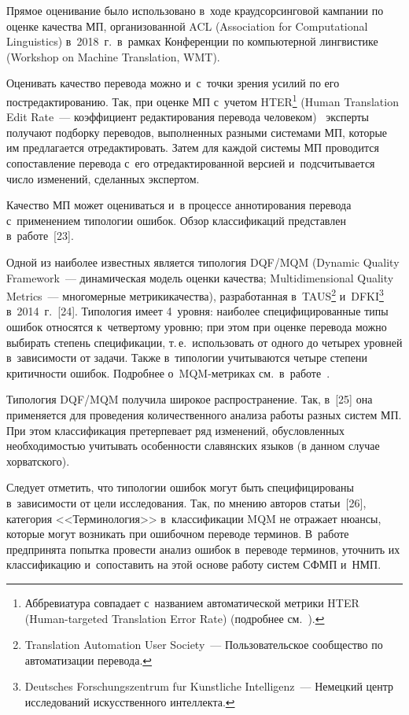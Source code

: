 \begin{multicols}{2}
  
  Прямое оценивание было использовано в~ходе краудсорсинговой кампании 
по оценке качества МП, организованной ACL (Association for Computational 
Linguistics) в~2018~г.\ в~рамках Конференции по компьютерной лингвистике 
(Workshop on Machine Translation, WMT).
  
  Оценивать качество перевода можно и~с~точки зрения усилий по его 
постредактированию. Так, при оценке МП с~учетом 
HTER\footnote{Аббревиатура совпадает с~названием автоматической метрики HTER  
(Human-targeted Translation Error Rate) (подробнее см.~\cite[с.~25]{18-nur}).} (Human 
Translation Edit Rate~--- коэффициент редактирования перевода 
человеком)~\cite[с.~51--52]{10-nur} эксперты получают подборку переводов, 
выполненных разными системами МП, которые им предлагается 
отредактировать. Затем для каждой системы МП проводится сопоставление 
перевода с~его отредактированной версией и~подсчитывается число 
изменений, сделанных экспертом.
  
  Качество МП может оцениваться и~в процессе аннотирования перевода 
с~применением типологии ошибок. Обзор классификаций представлен 
в~работе~[23].
  
  Одной из наиболее известных является типология DQF/MQM (Dynamic 
Quality Framework~--- динамическая модель оценки качества; 
Multidimensional Quality Metrics~--- многомерные метрики\linebreak \mbox{качества}), 
разработанная в~TAUS\footnote{Translation Automation User Society~--- Пользовательское 
сообщество по автоматизации перевода.} и~DFKI\footnote{Deutsches Forschungszentrum 
f$\ddot{\mbox{u}}$r K$\ddot{\mbox{u}}$nstliche Intelligenz~--- Немецкий центр исследований 
искусственного интеллекта.} в~2014~г.~[24]. Типология имеет 4~уровня: наиболее 
специфицированные типы ошибок относятся к~четвертому уровню; при этом 
при оценке перевода можно выбирать степень спецификации, т.\,е.\ 
использовать от одного до четырех уровней в~зависимости от задачи. Также 
в~типологии учитываются четыре степени критичности ошибок. Подробнее 
о~MQM-метриках см.\ в~работе~\cite{7-nur}.
  
  Типология DQF/MQM получила широкое распространение. Так, в~[25] она 
применяется для проведения количественного анализа работы разных систем 
МП. При этом классификация претерпевает ряд изменений, обусловленных 
необходимостью учитывать особенности славянских языков (в данном 
случае хорватского).
  
  Следует отметить, что типологии ошибок могут быть специфицированы 
в~зависимости от цели исследования. Так, по мнению авторов статьи~[26], 
категория <<Терминология>> в~классификации MQM не отражает нюансы, 
которые могут возникать при ошибочном переводе терминов. В~работе 
предпринята попытка провести анализ ошибок в~переводе терминов, 
уточнить их классификацию и~сопоставить на этой основе работу систем 
СФМП и~НМП.
  

\end{multicols}
